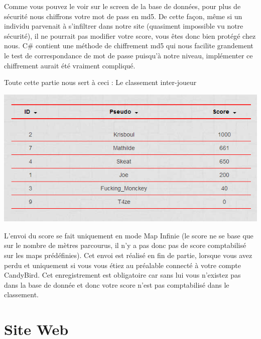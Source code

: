 \documentclass [11pt]{report}
\begin{document}
		
	\vspace{10mm}
	
	Comme vous pouvez le voir sur le screen de la base de données, pour plus de sécurité nous chiffrons votre mot de pass en md5. De cette façon, même si un individu parvenait à s'infiltrer dans notre site (quasiment impossible vu notre sécurité), il ne pourrait pas modifier votre score, vous êtes donc bien protégé chez nous. C\# contient une méthode de chiffrement md5 qui nous facilite grandement le test de correspondance de mot de passe puisqu'à notre niveau, implémenter ce chiffrement aurait été vraiment compliqué.
	
		
	\newpage
	
	Toute cette partie nous sert à ceci : Le classement inter-joueur
	
	\begin{center}
		\includegraphics[scale = 0.6]{images/classement.png}
	\end{center}
			
	
	
	\vspace{10mm}

	L'envoi du score se fait uniquement en mode Map Infinie (le score ne se base que sur le nombre de mètres parcourus, il n'y a pas donc pas de score comptabilisé sur les maps prédéfinies). Cet envoi est réalisé en fin de partie, lorsque vous avez perdu et uniquement si vous vous étiez au préalable connecté à votre compte CandyBird. Cet enregistrement est obligatoire car sans lui vous n'existez pas dans la base de donnée et donc votre score n'est pas comptabilisé dans le classement.
	 
	 \newpage
	 
	\section{Site Web}
	
\end{document}
